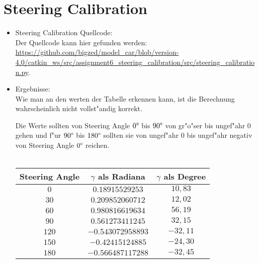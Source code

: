 \documentclass[10pt,oneside,a4paper]{article}
\begin{document}
  \section{Steering Calibration}
    \begin{itemize}
      \item Steering Calibration Quellcode:\\
        Der Quellcode kann hier gefunden werden:
        \url{https://github.com/bigzed/model_car/blob/version-4.0/catkin_ws/src/assignment6_steering_calibration/src/steering_calibration.py}.
      \item Ergebnisse:\\
        Wie man an den werten der Tabelle erkennen kann, ist die Berechnung wahrscheinlich nicht
        vollst"andig korrekt.

        Die Werte sollten von Steering Angle $0\degree$ bis $90\degree$ von gr"o"ser bis ungef"ahr
        $0$ gehen und f"ur $90\degree$ bis $180\degree$ sollten sie von ungef"ahr $0$ bis ungef"ahr
        negativ von Steering Angle $0\degree$ reichen.\\\\
        \begin{tabular}{c|c|c}
          Steering Angle & $\gamma$ als Radiana & $\gamma$ als Degree \\ \hline \hline
          $0$ & $0.18915529253$ & $10,83$\\
          $30$ & $0.209852060712$ & $12,02$ \\
          $60$ & $0.980816619634$ & $56,19$ \\
          $90$ & $0.561273411245$ & $32,15$ \\
          $120$ & $-0.543072958893$ & $-32,11$\\
          $150$ & $-0.42415124885$ & $-24,30$\\
          $180$ & $-0.566487117288$ & $-32,45$
        \end{tabular}
  \end{itemize}
\end{document}
